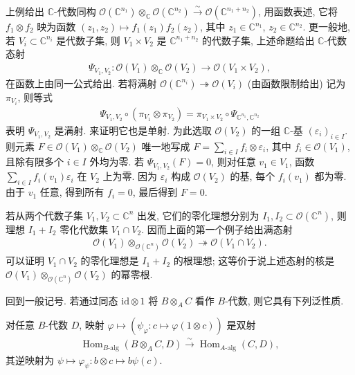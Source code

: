 \begin{example*}[{几何解释}]
上例给出 $\mathbb C$-代数同构 $\mathcal O(\mathbb C^{n_1})\otimes_{\mathbb C}\mathcal O(\mathbb C^{n_2})\xrightarrow{\sim}\mathcal O(\mathbb C^{n_1+n_2})$, 用函数表述, 它将 $f_1\otimes f_2$ 映为函数 $(z_1,z_2)\mapsto f_1(z_1)f_2(z_2)$, 其中 $z_1\in\mathbb C^{n_1}$, $z_2\in\mathbb C^{n_2}$. 更一般地, 若 $V_i\subset\mathbb C^{n_i}$ 是代数子集, 则 $V_1\times V_2$ 是 $\mathbb C^{n_1+n_2}$ 的代数子集, 上述命题给出 $\mathbb C$-代数态射
\begin{align*}
\Psi_{V_1,V_2}:\mathcal O(V_1)\otimes_{\mathbb C}\mathcal O(V_2)\longrightarrow\mathcal O(V_1\times V_2),
\end{align*}
在函数上由同一公式给出. 若将满射 $\mathcal O(\mathbb C^{n_i})\twoheadrightarrow\mathcal O(V_i)$ (由函数限制给出) 记为 $\pi_{V_i}$, 则等式
\begin{align*}
\Psi_{V_1,V_2}\circ(\pi_{V_1}\otimes\pi_{V_2})
=\pi_{V_1\times V_2}\circ\Psi_{\mathbb C^{n_1},\mathbb C^{n_2}}
\end{align*}
表明 $\Psi_{V_1,V_2}$ 是满射. 来证明它也是单射. 为此选取 $\mathcal O(V_2)$ 的一组 $\mathbb C$-基 $(\varepsilon_i)_{i\in I}$. 则元素 $F\in\mathcal O(V_1)\otimes_{\mathbb C}\mathcal O(V_2)$ 唯一地写成 $F=\sum_{i\in I}f_i\otimes\varepsilon_i$, 其中 $f_i\in\mathcal O(V_1)$, 且除有限多个 $i\in I$ 外均为零. 若 $\Psi_{V_1,V_2}(F)=0$, 则对任意 $v_1\in V_1$, 函数 $\sum_{i\in I}f_i(v_1)\varepsilon_i$ 在 $V_2$ 上为零. 因为 $\varepsilon_i$ 构成 $\mathcal O(V_2)$ 的基, 每个 $f_i(v_1)$ 都为零. 由于 $v_1$ 任意, 得到所有 $f_i=0$, 最后得到 $F=0$.
\end{example*}
\begin{remark*}
若从两个代数子集 $V_1,V_2\subset\mathbb C^n$ 出发, 它们的零化理想分别为 $I_1,I_2\subset\mathcal O(\mathbb C^n)$, 则理想 $I_1+I_2$ 零化代数集 $V_1\cap V_2$. 因而上面的第一个例子给出满态射
\begin{align*}
\mathcal O(V_1)\otimes_{\mathcal O(\mathbb C^n)}\mathcal O(V_2)\twoheadrightarrow\mathcal O(V_1\cap V_2).
\end{align*}
可以证明 $V_1\cap V_2$ 的零化理想是 $I_1+I_2$ 的根理想; 这等价于说上述态射的核是 $\mathcal O(V_1)\otimes_{\mathcal O(\mathbb C^n)}\mathcal O(V_2)$ 的幂零根.
\end{remark*}
回到一般记号. 若通过同态 $\mathrm{id}\otimes1$ 将 $B\otimes_A C$ 看作 $B$-代数, 则它具有下列泛性质.
\begin{corollary*}
对任意 $B$-代数 $D$, 映射 $\varphi\mapsto(\psi_\varphi:c\mapsto\varphi(1\otimes c))$ 是双射
\begin{align*}
\operatorname{Hom}_{B\text{-}\mathrm{alg}}(B\otimes_A C,D)\xrightarrow{\sim}\operatorname{Hom}_{A\text{-}\mathrm{alg}}(C,D),
\end{align*}
其逆映射为 $\psi\mapsto\varphi_\psi:b\otimes c\mapsto b\psi(c)$.
\end{corollary*}

